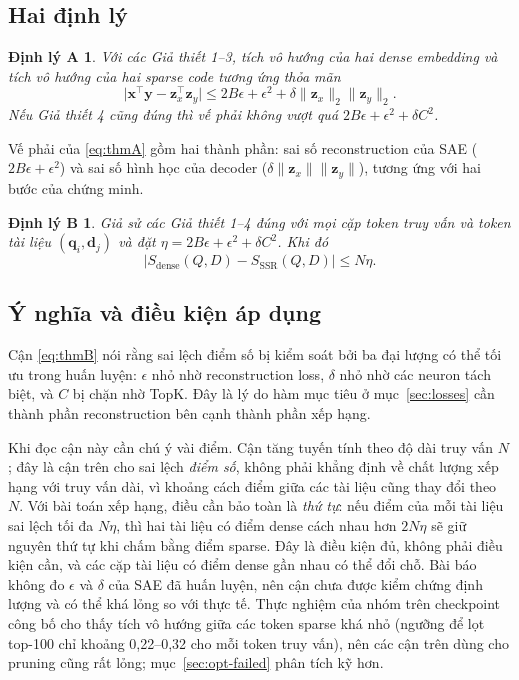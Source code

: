 \documentclass[a4paper,13pt]{extreport}
\theoremstyle{plain}
\newtheorem*{dinhlyA}{Định lý A}
\newtheorem*{dinhlyB}{Định lý B}
\newcommand{\bz}{\mathbf{z}}
\newcommand{\bx}{\mathbf{x}}
\newcommand{\by}{\mathbf{y}}
\newcommand{\bq}{\mathbf{q}}
\newcommand{\bd}{\mathbf{d}}
\begin{document}
\subsection{Hai định lý}
\begin{dinhlyA}
Với các Giả thiết 1--3, tích vô hướng của hai dense embedding và tích vô hướng của hai sparse code tương ứng thỏa mãn
\begin{equation}
\big|\bx^\top\by-\bz_x^\top\bz_y\big|\le 2B\epsilon+\epsilon^2+\delta\|\bz_x\|_2\|\bz_y\|_2 .
\label{eq:thmA}
\end{equation}
Nếu Giả thiết 4 cũng đúng thì vế phải không vượt quá $2B\epsilon+\epsilon^2+\delta C^2$.
\end{dinhlyA}
Vế phải của \eqref{eq:thmA} gồm hai thành phần: sai số reconstruction của SAE ($2B\epsilon+\epsilon^2$) và sai số hình học của decoder ($\delta\|\bz_x\|\|\bz_y\|$), tương ứng với hai bước của chứng minh.
\begin{dinhlyB}
Giả sử các Giả thiết 1--4 đúng với mọi cặp token truy vấn và token tài liệu $(\bq_i,\bd_j)$ và đặt $\eta=2B\epsilon+\epsilon^2+\delta C^2$. Khi đó
\begin{equation}
\big|S_{\mathrm{dense}}(Q,D)-S_{\mathrm{SSR}}(Q,D)\big|\le N\eta .
\label{eq:thmB}
\end{equation}
\end{dinhlyB}

\subsection{Ý nghĩa và điều kiện áp dụng}
\label{sec:theory-meaning}
Cận \eqref{eq:thmB} nói rằng sai lệch điểm số bị kiểm soát bởi ba đại lượng có thể tối ưu trong huấn luyện: $\epsilon$ nhỏ nhờ reconstruction loss, $\delta$ nhỏ nhờ các neuron tách biệt, và $C$ bị chặn nhờ TopK. Đây là lý do hàm mục tiêu ở mục~\ref{sec:losses} cần thành phần reconstruction bên cạnh thành phần xếp hạng.

Khi đọc cận này cần chú ý vài điểm. Cận tăng tuyến tính theo độ dài truy vấn $N$; đây là cận trên cho sai lệch \emph{điểm số}, không phải khẳng định về chất lượng xếp hạng với truy vấn dài, vì khoảng cách điểm giữa các tài liệu cũng thay đổi theo $N$. Với bài toán xếp hạng, điều cần bảo toàn là \emph{thứ tự}: nếu điểm của mỗi tài liệu sai lệch tối đa $N\eta$, thì hai tài liệu có điểm dense cách nhau hơn $2N\eta$ sẽ giữ nguyên thứ tự khi chấm bằng điểm sparse. Đây là điều kiện đủ, không phải điều kiện cần, và các cặp tài liệu có điểm dense gần nhau có thể đổi chỗ. Bài báo không đo $\epsilon$ và $\delta$ của SAE đã huấn luyện, nên cận chưa được kiểm chứng định lượng và có thể khá lỏng so với thực tế. Thực nghiệm của nhóm trên checkpoint công bố cho thấy tích vô hướng giữa các token sparse khá nhỏ (ngưỡng để lọt top-100 chỉ khoảng 0,22--0,32 cho mỗi token truy vấn), nên các cận trên dùng cho pruning cũng rất lỏng; mục~\ref{sec:opt-failed} phân tích kỹ hơn.
\end{document}
